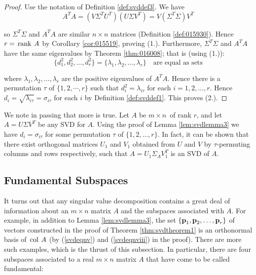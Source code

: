 \begin{proof} Use the notation of Definition \ref{def:svddef3}. We
have
\begin{equation*}
A^{T}A=(V\Sigma^{T}U^{T})(U\Sigma V^{T})=V(\Sigma^{T}\Sigma)V^{T}
\end{equation*}

\noindent so $\Sigma^{T}\Sigma $ and $A^{T}A$ are similar $n\times n$
matrices (Definition \ref{def:015930}). Hence $r=\thinspace\operatorname{rank\medspace} A$ by
Corollary \ref{cor:015519}, proving (1.).  Furthermore, $\Sigma^{T}\Sigma $ and $A^{T}A$
have the same eigenvalues by Theorem \ref{thm:016008}; that is (using (1.)):
\begin{equation*}
\{d_{1}^{2},d_{2}^{2},\dots ,d_{r}^{2}\}=\{\lambda_{1},\lambda_{2},\dots ,\lambda_{r}\} \quad \mbox{are equal as sets} 
\end{equation*} 

\noindent where $\lambda_{1},\lambda_{2},\dots ,\lambda_{r}$ are the
positive eigenvalues of $A^{T}A$. Hence there is a permutation $\tau $ of $\{1,2,\cdots ,r\}$ such that  $d_{i}^{2}=\lambda_{i\tau }$ for each $i=1,2,\dots ,r$. Hence $d_{i}=\sqrt{\lambda_{i\tau }}=\sigma_{i\tau }$
for each $i$ by Definition \ref{def:svddef1}. This proves (2.). 
\end{proof} 

We note in passing that more is true. Let $A$ be $m\times n$\ of rank $r$,
and let $A=U\Sigma V^{T}$ be any SVD for $A$. Using the proof of Lemma \ref{lem:svdlemma3}
we have $d_{i}=\sigma_{i\tau }$ for some permutation $\tau $ of $\{1,2,\dots ,r\}.$ In fact, it can be shown that there exist orthogonal
matrices $U_{1}$ and $V_{1}$ obtained from $U$ and $V$ by $\tau$-permuting columns and rows respectively, such that $A=U_{1}\Sigma_{A}V_{1}^{T}$ is an SVD of $A$. 


\subsection{Fundamental Subspaces}

\noindent It turns out that any singular value decomposition contains a
great deal of information about an $m\times n$ matrix $A$ and the subspaces
associated with $A$. For example, in addition to Lemma \ref{lem:svdlemma3}, the set $\{\textbf{p}_{1},\textbf{p}_{2},\ldots ,\textbf{p}_{r}\}$ of vectors
constructed in the proof of Theorem \ref{thm:svdtheorem1} is an orthonormal basis of $\thinspace\operatorname{col\medspace} A$ (by (\ref{svdeqnv}) and (\ref{svdeqnviii}) in the proof). There
are more such examples, which is the thrust of this subsection. In
particular, there are four subspaces associated to a real $m\times n$ matrix 
$A$ that have come to be called fundamental: 

